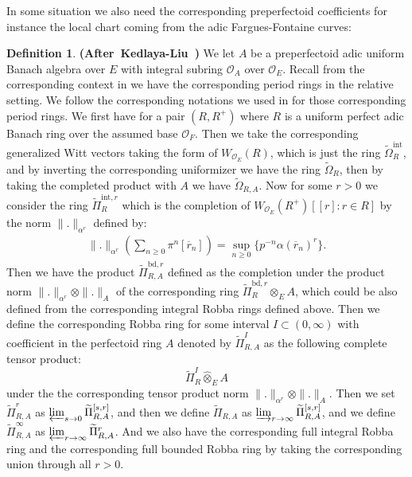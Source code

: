 \documentclass[12pt]{amsart}
\theoremstyle{definition}
\newtheorem{definition}[theorem]{Definition}
\numberwithin{equation}{section}
\begin{document}
\indent In some situation we also need the corresponding preperfectoid coefficients for instance the local chart coming from the adic Fargues-Fontaine curves:


\begin{definition}  \mbox{\bf{(After Kedlaya-Liu \cite[Definition 4.1.1]{KL2})}}
We let $A$ be a preperfectoid adic uniform Banach algebra over $E$ with integral subring $\mathcal{O}_A$ over $\mathcal{O}_E$. Recall from the corresponding context in \cite{KL1} we have the corresponding period rings in the relative setting. We follow the corresponding notations we used in \cite[Section 2.1]{T2} for those corresponding period rings. We first have for a pair $(R,R^+)$ where $R$ is a uniform perfect adic Banach ring over the assumed base $\mathcal{O}_F$. Then we take the corresponding generalized Witt vectors taking the form of $W_{\mathcal{O}_E}(R)$, which is just the ring $\widetilde{\Omega}_R^\mathrm{int}$, and by inverting the corresponding uniformizer we have the ring $\widetilde{\Omega}_R$, then by taking the completed product with $A$ we have $\widetilde{\Omega}_{R,A}$. Now for some $r>0$ we consider the ring $\widetilde{\Pi}^{\mathrm{int},r}_{R}$ which is the completion of $W_{\mathcal{O}_E}(R^+)[[r]:r\in R] $ by the norm $\|.\|_{\alpha^r}$ defined by:
\begin{align}
\|.\|_{\alpha^r}(\sum_{n\geq 0}\pi^n[\overline{r}_n])=\sup_{n\geq 0}\{p^{-n}\alpha(\overline{r}_n)^r\}.	
\end{align}
Then we have the product $\widetilde{\Pi}^{\mathrm{bd},r}_{R,A}$ defined as the completion under the product norm $\|.\|_{\alpha^r}\otimes \|.\|_A$ of the corresponding ring $\widetilde{\Pi}^{\mathrm{bd},r}_{R}\otimes_{E}A$, which could be also defined from the corresponding integral Robba rings defined above. Then we define the corresponding Robba ring for some interval $I\subset (0,\infty)$ with coefficient in the perfectoid ring $A$ denoted by $\widetilde{\Pi}^{I}_{R,A}$ as the following complete tensor product:
\begin{displaymath}
\widetilde{\Pi}^{I}_{R}\widehat{\otimes}_{E} A	
\end{displaymath}
under the the corresponding tensor product norm $\|.\|_{\alpha^r}\otimes \|.\|_A$. Then we set $\widetilde{\Pi}^r_{R,A}$ as $\varprojlim_{s\rightarrow 0}\widetilde{\Pi}^{[s,r]}_{R,A}$, and then we define $\widetilde{\Pi}_{R,A}$ as $\varinjlim_{r\rightarrow \infty}\widetilde{\Pi}^{[s,r]}_{R,A}$, and we define $\widetilde{\Pi}^\infty_{R,A}$ as $\varprojlim_{r\rightarrow \infty}\widetilde{\Pi}^{r}_{R,A}$. And we also have the corresponding full integral Robba ring and the corresponding full bounded Robba ring by taking the corresponding union through all $r>0$.
\end{definition}
\end{document}
